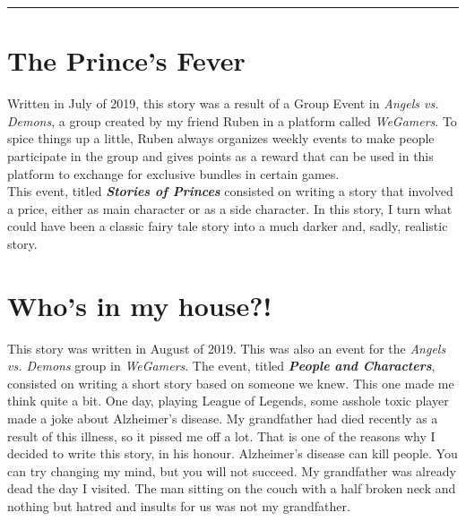 \documentclass[a4paper,onecolumn,11pt]{article}
\begin{document}
\appendix

\hrule

\section{The Prince's Fever}

Written in July of 2019, this story was a result of a Group Event in \textit{Angels vs. Demons}, a group created by my  friend Ruben in a platform called \textit{WeGamers}. To spice things up a little, Ruben always organizes weekly events to make people participate in the group and gives points as a reward that can be used in this platform to exchange for exclusive bundles in certain games.\\
\newline
This event, titled \textbf{\textit{Stories of Princes}} consisted on writing a story that involved a price, either as main character or as a side character.
In this story, I turn what could have been a classic fairy tale story into a much darker and, sadly, realistic story.


\section{Who's in my house?!}

This story was written in August of 2019. This was also an event for the \textit{Angels vs. Demons} group in \textit{WeGamers}. The event, titled \textbf{\textit{People and Characters}}, consisted on writing a short story based on someone we knew. This one made me think quite a bit. One day, playing League of Legends, some asshole toxic player made a joke about Alzheimer's disease. My grandfather had died recently as a result of this illness, so it pissed me off a lot. That is one of the reasons why I decided to write this story, in his honour. Alzheimer's disease can kill people. You can try changing my mind, but you will not succeed. My grandfather was already dead the day I visited. The man sitting on the couch with a half broken neck and nothing but hatred and insults for us was not my grandfather.

\end{document}
